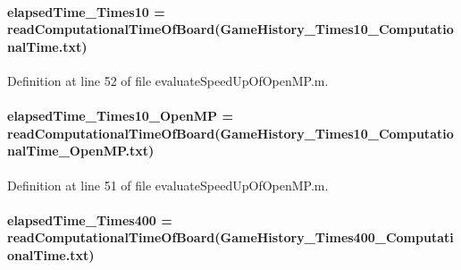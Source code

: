 \paragraph[{elapsed\+Time\+\_\+10\+Times10}]{\setlength{\rightskip}{0pt plus 5cm}elapsed\+Time\+\_\+Times10 = read\+Computational\+Time\+Of\+Board(\textquotesingle{}Game\+History\+\_\+Times10\+\_\+\+Computational\+Time.\+txt\textquotesingle{})}\label{a00100_a77a507e5a0b77cdca2f380c2a67dda92}


Definition at line 52 of file evaluate\+Speed\+Up\+Of\+Open\+M\+P.\+m.

\hypertarget{a00100_abb7203de0010df4491d1db729b4985ac}{}
\paragraph[{elapsed\+Time\+\_\+10\+Times10\+\_\+\+Open\+M\+P}]{\setlength{\rightskip}{0pt plus 5cm}elapsed\+Time\+\_\+Times10\+\_\+\+Open\+M\+P = read\+Computational\+Time\+Of\+Board(\textquotesingle{}Game\+History\+\_\+Times10\+\_\+\+Computational\+Time\+\_\+\+Open\+M\+P.\+txt\textquotesingle{})}\label{a00100_abb7203de0010df4491d1db729b4985ac}


Definition at line 51 of file evaluate\+Speed\+Up\+Of\+Open\+M\+P.\+m.

\hypertarget{a00100_a03937bae300a959855cddd0d6d315fc0}{}
\paragraph[{elapsed\+Time\+\_\+200\+Times400}]{\setlength{\rightskip}{0pt plus 5cm}elapsed\+Time\+\_\+Times400 = read\+Computational\+Time\+Of\+Board(\textquotesingle{}Game\+History\+\_\+Times400\+\_\+\+Computational\+Time.\+txt\textquotesingle{})}\label{a00100_a03937bae300a959855cddd0d6d315fc0}


